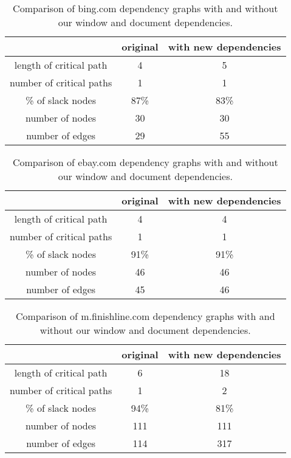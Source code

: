 \begin{table*}[tb]
\centering
\small
\begin{tabular}{|c|c|c|}
\hline
 & original & with new dependencies \\
\hline
length of critical path & 4 & 5 \\
number of critical paths & 1 & 1 \\
\% of slack nodes & 87\% & 83\% \\
number of nodes & 30 & 30 \\
number of edges & 29 & 55 \\
\hline
\end{tabular}\caption{Comparison of bing.com dependency graphs with and without our window and document dependencies.}
\label{t:binggraph}
\end{table*}

\begin{table*}[tb]
\centering
\small
\begin{tabular}{|c|c|c|}
\hline
 & original & with new dependencies \\
\hline
length of critical path & 4 & 4 \\
number of critical paths & 1 & 1 \\
\% of slack nodes & 91\% & 91\% \\
number of nodes & 46 & 46 \\
number of edges & 45 & 46 \\
\hline
\end{tabular}\caption{Comparison of ebay.com dependency graphs with and without our window and document dependencies.}
\label{t:ebaygraph}
\end{table*}

\begin{table*}[tb]
\centering
\small
\begin{tabular}{|c|c|c|}
\hline
 & original & with new dependencies \\
\hline
length of critical path & 6 & 18 \\
number of critical paths & 1 & 2 \\
\% of slack nodes & 94\% & 81\% \\
number of nodes & 111 & 111 \\
number of edges & 114 & 317 \\
\hline
\end{tabular}\caption{Comparison of m.finishline.com dependency graphs with and without our window and document dependencies.}
\label{t:finishlinegraph}
\end{table*}


